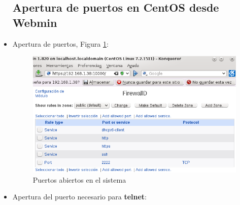 \begin{itemize}
\subsection{Apertura de puertos en CentOS desde Webmin}

	\item Apertura de puertos, Figura \ref{fig:figura45}:
	\begin{figure}[H] %
		\centering
		\includegraphics[scale=0.7]{figuras/figura45.png} 
		\caption{Puertos abiertos en el sistema} 
		\label{fig:figura45}
	\end{figure}

	\item Apertura del puerto necesario para \textbf{telnet}:
	

\end{itemize}
